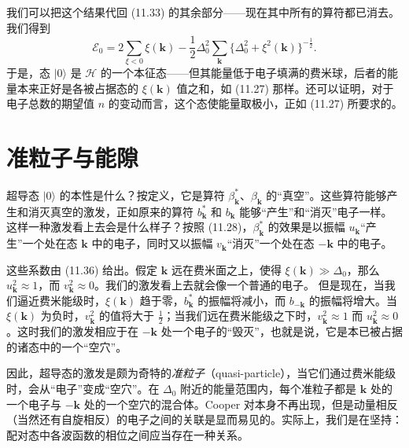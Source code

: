我们可以把这个结果代回 (11.33) 的其余部分——现在其中所有的算符都已消去。我们得到
\begin{equation*}
\mathcal{E}_{0}=2\sum_{\xi<0}\xi(\mathbf{k})-\frac{1}{2}\Delta^{2}_{0}\sum_{\mathbf{k}}\{\Delta^{2}_{0}+\xi^{2}(\mathbf{k})\}^{-\frac{1}{2}}.
\tag{11.38}
\end{equation*}
于是，态 $|0\rangle$ 是 $\mathcal{H}$ 的一个本征态——但其能量低于电子填满的费米球，后者的能量本来正好是各被占据态的 $\xi(\mathbf{k})$ 值之和，如 (11.27) 那样。还可以证明，对于电子总数的期望值 $n$ 的变动而言，这个态使能量取极小，正如 (11.27) 所要求的。

\section{准粒子与能隙}

超导态 $|0\rangle$ 的本性是什么？按定义，它是算符 $\beta^{*}_{\mathbf{k}}$、$\beta_{\mathbf{k}}$ 的“真空”。这些算符能够产生和消灭真空的激发，正如原来的算符 $b^{*}_{\mathbf{k}}$ 和 $b_{\mathbf{k}}$ 能够“产生”和“消灭”电子一样。这样一种激发看上去会是什么样子？按照 (11.28)，$\beta^{*}_{\mathbf{k}}$ 的效果是以振幅 $u_{\mathbf{k}}$“产生”一个处在态 $\mathbf{k}$ 中的电子，同时又以振幅 $v_{\mathbf{k}}$“消灭”一个处在态 $-\mathbf{k}$ 中的电子。

这些系数由 (11.36) 给出。假定 $\mathbf{k}$ 远在费米面之上，使得 $\xi(\mathbf{k})\gg\Delta_{0}$，那么 $u^{2}_{\mathbf{k}}\approx 1$，而 $v^{2}_{\mathbf{k}}\approx 0$。我们的激发看上去就会像一个普通的电子。
但是现在，当我们逼近费米能级时，$\xi(\mathbf{k})$ 趋于零，$b^{*}_{\mathbf{k}}$ 的振幅将减小，而 $b_{-\mathbf{k}}$ 的振幅将增大。当 $\xi(\mathbf{k})$ 为负时，$v^{2}_{\mathbf{k}}$ 的值将大于 $\frac{1}{2}$；当我们远在费米能级之下时，$v^{2}_{\mathbf{k}}\approx 1$ 而 $u^{2}_{\mathbf{k}}\approx 0$。这时我们的激发相应于在 $-\mathbf{k}$ 处一个电子的“毁灭”，也就是说，它是本已被占据的诸态中的一个“空穴”。

因此，超导态的激发是颇为奇特的\emph{准粒子}（quasi-particle），当它们通过费米能级时，会从“电子”变成“空穴”。在 $\Delta_{0}$ 附近的能量范围内，每个准粒子都是 $\mathbf{k}$ 处的一个电子与 $-\mathbf{k}$ 处的一个空穴的混合体。Cooper 对本身不再出现，但是动量相反（当然还有自旋相反）的电子之间的关联是显而易见的。实际上，我们是在坚持：配对态中各波函数的相位之间应当存在一种关系。

